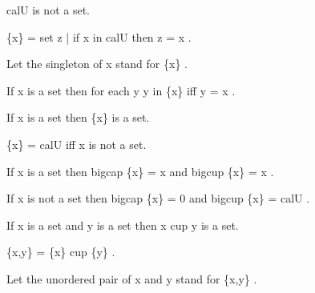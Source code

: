 \documentclass[a4paper,draft]{amsproc}
\begin{document}
\begin{forthel}
\begin{theorem}
 cal{U}  is not a set.
\end{theorem}

\begin{definition}  \{x\} = { set  z |  if  x in cal{U}  then  z = x} .\end{definition}
Let the singleton of  x  stand for  \{x\} .


\begin{theorem}
If  x  is a set then for each  y   y in \{x\}  iff  y = x .
\end{theorem}

\begin{theorem}
If  x  is a set then  \{x\}  is a set.
\end{theorem}

\begin{theorem}
 \{x\} = cal{U}  iff  x  is not a set.
\end{theorem}

\begin{theorem}
If  x  is a set then  bigcap \{x\} = x  
and  bigcup \{x\} = x .
\end{theorem}

\begin{theorem}
If  x  is not a set then  bigcap \{x\} = 0 
and  bigcup \{x\} = cal{U} .
\end{theorem}

\begin{axiom}
If  x  is a set and  y  is a set then  x cup y  is a set.
\end{axiom}

\begin{definition}  \{x,y\} = \{x\} cup \{y\} .\end{definition}
Let the unordered pair of  x  and  y  stand for  \{x,y\} .



\end{forthel}
\end{document}
